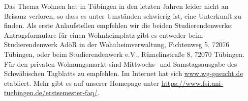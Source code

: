 Das Thema Wohnen hat in Tübingen in den letzten Jahren leider nicht an Brisanz verloren, so dass
es unter Umständen schwierig ist, eine Unterkunft zu finden. Als erste Anlaufstellen empfehlen wir
die beiden Studierendenwerke: Antragsformulare für einen Wohnheimplatz gibt es entweder beim
Studierendenwerk AdöR in der Wohnheimverwaltung, Fichtenweg 5, 72076 Tübingen, oder beim Studierendenwerk
e.V., Rümelinstraße 8, 72070 Tübingen. Für den privaten Wohnungsmarkt sind Mittwochs- und Samstagsausgabe
des Schwäbischen Tagblatts zu empfehlen.
Im Internet hat sich \url{www.wg-gesucht.de} etabliert. Mehr gibt es auf unserer Homepage unter \url{https://www.fsi.uni-tuebingen.de/erstsemester-faq/}.
\fi
